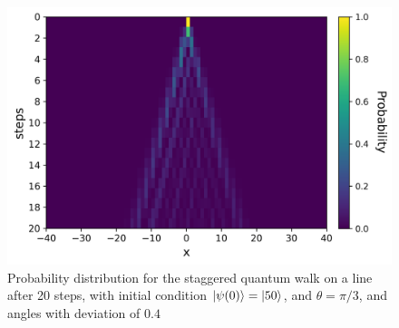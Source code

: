 \documentclass[11pt]{article}
\theoremstyle{plain}
\begin{document}
\begin{figure}[!h]
	\centering
	\includegraphics[scale=0.70]{img/Experiments/sqw_N121_t20_thetapi8-pi7_init0.png}
	\caption{Probability distribution for the staggered quantum walk on a line after 20 steps, with initial condition $\ket{\psi(0)}=\ket{50}$, and $\theta = \pi/3$, and angles with deviation of $0.4$} 
	\label{fig:stagQWSimulMultTheta}
\end{figure}\par
\end{document}
